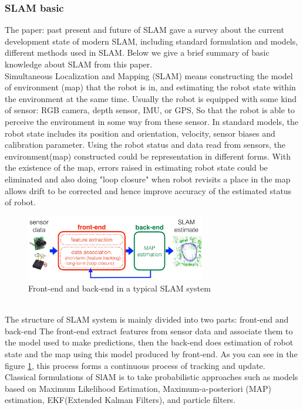 \documentclass[12pt,twoside]{article}
\begin{document}
\subsubsection{SLAM basic}
The paper: past present and future of SLAM \cite{cadena2016past} gave a survey about the current development state of modern SLAM, including standard formulation and models, different methods used in SLAM. Below we give a brief summary of basic knowledge about SLAM from this paper.\\
Simultaneous Localization and Mapping (SLAM) means constructing the model of environment (map) that the robot is in, and estimating the robot state within the environment at the same time. Usually the robot is equipped with some kind of sensor: RGB camera, depth sensor, IMU, or GPS, So that the robot is able to perceive the environment in some way from these sensor. In standard models, the robot state includes its position and orientation, velocity, sensor biases and calibration parameter. Using the robot status and  data read from sensors, the environment(map) constructed could be representation in different forms. With the existence of the map, errors raised in estimating robot state could be eliminated and also doing "loop closure" when robot revisits a place in the map allows drift to be corrected and hence improve accuracy of the estimated status of robot.\\
\begin{figure}[h]
    \centering
    \includegraphics[width=0.7\textwidth]{figures/slamStructure}
    \caption{Front-end and back-end in a typical SLAM system\cite{cadena2016past}}
    \label{fig:slamStructure}
\end{figure}
\\The structure of SLAM system is mainly divided into two parts: front-end and back-end
The front-end extract features from sensor data and associate them to the model used to make predictions, then the back-end does estimation of robot state and the map using this model produced by front-end. As you can see in the figure \ref{fig:slamStructure}, this process forms a continuous process of tracking and update.\\
Classical formulations of SlAM is to take probabilistic approaches such as models based on Maximum Likelihood Estimation, Maximum-a-posteriori (MAP) estimation, EKF(Extended Kalman Filters), and particle filters.\\
\end{document}
